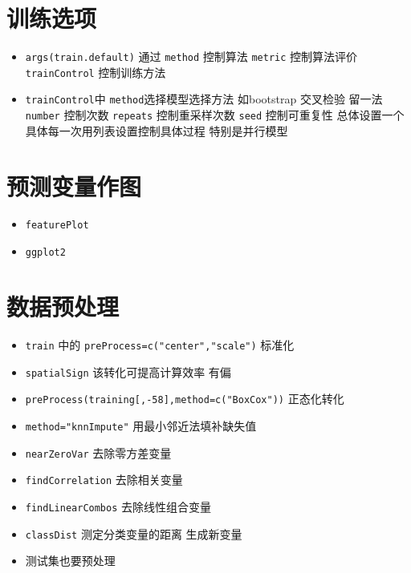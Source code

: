 \documentclass[
]{book}
\providecommand{\tightlist}{%
  \setlength{\itemsep}{0pt}\setlength{\parskip}{0pt}}
\begin{document}
\hypertarget{ux8badux7ec3ux9009ux9879}{%
\section{训练选项}\label{ux8badux7ec3ux9009ux9879}}

\begin{itemize}
\tightlist
\item
  \texttt{args(train.default)} 通过 \texttt{method} 控制算法 \texttt{metric} 控制算法评价 \texttt{trainControl} 控制训练方法
\item
  \texttt{trainControl}中 \texttt{method}选择模型选择方法 如bootstrap 交叉检验 留一法 \texttt{number} 控制次数 \texttt{repeats} 控制重采样次数 \texttt{seed} 控制可重复性 总体设置一个 具体每一次用列表设置控制具体过程 特别是并行模型
\end{itemize}

\hypertarget{ux9884ux6d4bux53d8ux91cfux4f5cux56fe}{%
\section{预测变量作图}\label{ux9884ux6d4bux53d8ux91cfux4f5cux56fe}}

\begin{itemize}
\tightlist
\item
  \texttt{featurePlot}
\item
  \texttt{ggplot2}
\end{itemize}

\hypertarget{ux6570ux636eux9884ux5904ux7406}{%
\section{数据预处理}\label{ux6570ux636eux9884ux5904ux7406}}

\begin{itemize}
\tightlist
\item
  \texttt{train} 中的 \texttt{preProcess=c("center","scale")} 标准化
\item
  \texttt{spatialSign} 该转化可提高计算效率 有偏
\item
  \texttt{preProcess(training{[},-58{]},method=c("BoxCox"))} 正态化转化
\item
  \texttt{method="knnImpute"} 用最小邻近法填补缺失值
\item
  \texttt{nearZeroVar} 去除零方差变量
\item
  \texttt{findCorrelation} 去除相关变量
\item
  \texttt{findLinearCombos} 去除线性组合变量
\item
  \texttt{classDist} 测定分类变量的距离 生成新变量
\item
  测试集也要预处理
\end{itemize}
\end{document}
